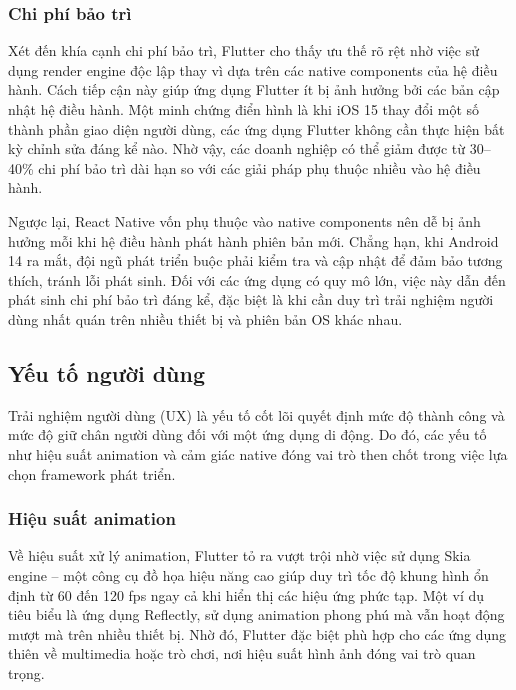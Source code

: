\subsubsection{Chi phí bảo trì}


    Xét đến khía cạnh chi phí bảo trì, Flutter cho thấy ưu thế rõ rệt nhờ việc sử dụng render engine độc lập thay vì dựa trên các native components của hệ điều hành. Cách tiếp cận này giúp ứng dụng Flutter ít bị ảnh hưởng bởi các bản cập nhật hệ điều hành. Một minh chứng điển hình là khi iOS 15 thay đổi một số thành phần giao diện người dùng, các ứng dụng Flutter không cần thực hiện bất kỳ chỉnh sửa đáng kể nào. Nhờ vậy, các doanh nghiệp có thể giảm được từ 30–40\% chi phí bảo trì dài hạn so với các giải pháp phụ thuộc nhiều vào hệ điều hành.

    \vspace{0.5em}

    Ngược lại, React Native vốn phụ thuộc vào native components nên dễ bị ảnh hưởng mỗi khi hệ điều hành phát hành phiên bản mới. Chẳng hạn, khi Android 14 ra mắt, đội ngũ phát triển buộc phải kiểm tra và cập nhật để đảm bảo tương thích, tránh lỗi phát sinh. Đối với các ứng dụng có quy mô lớn, việc này dẫn đến phát sinh chi phí bảo trì đáng kể, đặc biệt là khi cần duy trì trải nghiệm người dùng nhất quán trên nhiều thiết bị và phiên bản OS khác nhau.

\subsection{Yếu tố người dùng}


    Trải nghiệm người dùng (UX) là yếu tố cốt lõi quyết định mức độ thành công và mức độ giữ chân người dùng đối với một ứng dụng di động. Do đó, các yếu tố như hiệu suất animation và cảm giác native đóng vai trò then chốt trong việc lựa chọn framework phát triển.

\subsubsection{Hiệu suất animation}


    Về hiệu suất xử lý animation, Flutter tỏ ra vượt trội nhờ việc sử dụng Skia engine – một công cụ đồ họa hiệu năng cao giúp duy trì tốc độ khung hình ổn định từ 60 đến 120 fps ngay cả khi hiển thị các hiệu ứng phức tạp. Một ví dụ tiêu biểu là ứng dụng Reflectly, sử dụng animation phong phú mà vẫn hoạt động mượt mà trên nhiều thiết bị. Nhờ đó, Flutter đặc biệt phù hợp cho các ứng dụng thiên về multimedia hoặc trò chơi, nơi hiệu suất hình ảnh đóng vai trò quan trọng.

